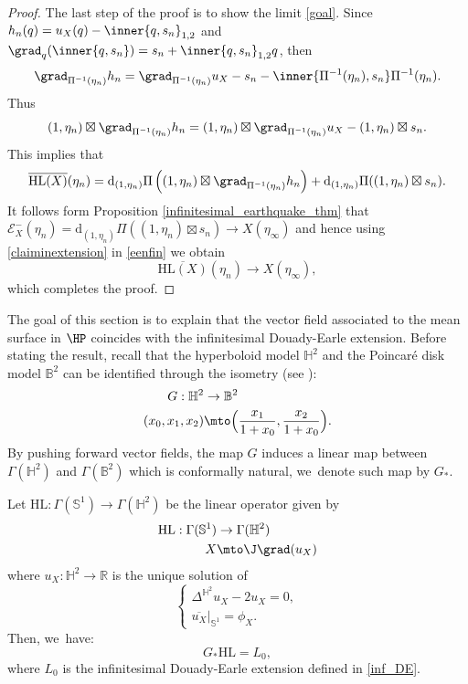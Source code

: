 \begin{proof}
The last step of the proof is to show the limit \eqref{goal}. Since $h_n(q)=u_X(q)-\inner{q,s_n}_{1,2}$ and $\grad_q(\inner{q,s_n})=s_n+\inner{q,s_n}_{1,2}q$, then
\[
\grad_{\Pi^{-1}(\eta_n)}h_n=\grad_{\Pi^{-1}(\eta_n)}u_X-s_n-\inner{\Pi^{-1}(\eta_n),s_n}\Pi^{-1}(\eta_n).
\]
Thus
\[
(1,\eta_n)\boxtimes\grad_{\Pi^{-1}(\eta_n)}h_n=(1,\eta_n)\boxtimes\grad_{\Pi^{-1}(\eta_n)}u_X-(1,\eta_n)\boxtimes s_n.
\]
This implies that
\begin{equation}\label{eenfin}
\overline{\mathrm{HL}(X)}(\eta_n)=\mathrm{d}_{(1,\eta_n)}\Pi\left((1,\eta_n)\boxtimes\grad_{\Pi^{-1}(\eta_n)} h_n \right)+\mathrm{d}_{(1,\eta_n)}\Pi((1,\eta_n)\boxtimes s_n).
\end{equation}
It follows form Proposition \ref{infinitesimal_earthquake_thm} that $ \mathcal{E}^-_X(\eta_n)=\mathrm{d}_{(1,\eta_n)}\Pi\left((1,\eta_n)\boxtimes s_n\right)\to X(\eta_{\infty})$ and hence using \eqref{claiminextension} in \eqref{eenfin} we obtain
\[
\overline{\mathrm{HL}(X)}(\eta_n)\to X(\eta_{\infty}),
\]
which completes the proof.
\end{proof}

The goal of this section is to explain that the vector field associated to the mean surface in $\HP$ coincides with the infinitesimal Douady-Earle extension. Before stating the result, recall that the hyperboloid model $\mathbb{H}^2$ and the Poincaré disk model $\mathbb{B}^2$ can be identified through the isometry (see \cite[Chap.\,2]{martelli2022introduction}):
\begin{equation}\label{H2_to_B2}
\begin{aligned}
G : \mathbb{H}^2 & \to \mathbb{B}^2 \\
(x_0,x_1,x_2) & \mto \Bigl(\frac{x_1}{1+x_0}, \frac{x_2}{1+x_0}\Bigr).
\end{aligned}
\end{equation}
By pushing forward vector fields, the map $G$ induces a linear map between $\Gamma(\mathbb{H}^2)$ and $\Gamma(\mathbb{B}^2)$ which is conformally natural, we~denote such map by $G_*$.
\begin{prop}\label{HL_DE}
Let $\mathrm{HL}:\Gamma(\mathbb{S}^1)\to\Gamma(\mathbb{H}^2)$ be the linear operator given by
\[
\begin{aligned}
\mathrm{HL}: \Gamma(\mathbb{S}^1) & \to \Gamma(\mathbb{H}^2) \\
X & \mto\J\grad(u_X)
\end{aligned}
\]
where $u_X:\mathbb{H}^2\to\mathbb{R}$ is the unique solution of
\begin{equation}\label{platau_HPX}
\begin{cases}
\Delta^{\mathbb{H}^2} u_X-2u_X=0, \\
\overline{u_X}|_{\mathbb{S}^1}=\phi_X.
\end{cases}\end{equation}
Then, we~have:
\[
G_*\mathrm{HL}=L_0,
\]
where $L_0$ is the infinitesimal Douady-Earle extension defined in \eqref{inf_DE}.
\end{prop}


